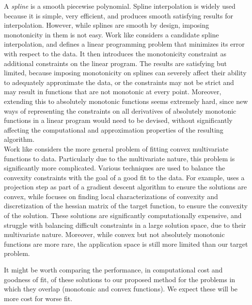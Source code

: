 \documentclass[12pt,a4paper]{article}
\begin{document}
A {\emph{spline}} is a smooth piecewise polynomial. Spline interpolation is widely used because it is simple, very efficient, and produces smooth satisfying results for interpolation. However, while splines are smooth by design, imposing monotonicity in them is not easy. Work like \cite{1998_he_monotone_spline,2004_zhang_monotone_splines, 2013_nagahara_monotone_splines_linear, 2015_lu_spline_monotonic_regression} considers a candidate spline interpolation, and defines a linear programming problem that minimizes its error with respect to the data. It then introduces the monotonicity constraint as additional constraints on the linear program. The results are satisfying but limited, because imposing monotonicity on splines can severely affect their ability to adequately approximate the data, or the constraints may not be strict and may result in functions that are not monotonic at every point. Moreover, extending this to absolutely monotonic functions seems extremely hard, since new ways of representing the constraints on all derivatives of absolutely monotonic functions in a linear program would need to be devised, without significantly affecting the computational and approximation properties of the resulting algorithm.\\

Work like \cite{2013_hannah_multivariate_convex_regression} considers the more general problem of fitting convex multivariate functions to data. Particularly due to the multivariate nature, this problem is significantly more complicated. Various techniques are used to balance the convexity constraints with the goal of a good fit to the data. For example, \cite{2005_lachand_minimizing_convex_bodies} uses a projection step as part of a gradient descent algorithm to ensure the solutions are convex, while \cite{2008_aguilera_approximating_optimization_convex_functions} focuses on finding local characterizations of convexity and discretization of the hessian matrix of the target function, to ensure the convexity of the solution. These solutions are significantly computationally expensive, and struggle with balancing difficult constraints in a large solution space, due to their multivariate nature. Moreover, while convex but not absolutely monotonic functions are more rare, the application space is still more limited than our target problem.

It might be worth comparing the performance, in computational cost and goodness of fit, of these solutions to our proposed method for the problems in which they overlap (monotonic and convex functions). We expect these will be more cost for worse fit.\\
\end{document}
